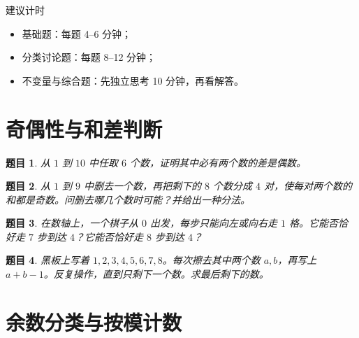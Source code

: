 \documentclass[11pt,a4paper,fontset=fandol]{ctexart}
\theoremstyle{formalexample}
\newtheorem{exercise}{题目}[section]
\begin{document}
\begin{notebox}{建议计时}
\begin{itemize}
  \item 基础题：每题 4--6 分钟；
  \item 分类讨论题：每题 8--12 分钟；
  \item 不变量与综合题：先独立思考 10 分钟，再看解答。
\end{itemize}
\end{notebox}

\section{奇偶性与和差判断}

\begin{center}
\end{center}

\begin{exercise}
从 $1$ 到 $10$ 中任取 $6$ 个数，证明其中必有两个数的差是偶数。
\end{exercise}

\begin{exercise}
从 $1$ 到 $9$ 中删去一个数，再把剩下的 $8$ 个数分成 $4$ 对，使每对两个数的和都是奇数。问删去哪几个数时可能？并给出一种分法。
\end{exercise}

\begin{exercise}
在数轴上，一个棋子从 $0$ 出发，每步只能向左或向右走 $1$ 格。它能否恰好走 $7$ 步到达 $4$？它能否恰好走 $8$ 步到达 $4$？
\end{exercise}

\begin{exercise}
黑板上写着 $1,2,3,4,5,6,7,8$。每次擦去其中两个数 $a,b$，再写上 $a+b-1$。反复操作，直到只剩下一个数。求最后剩下的数。
\end{exercise}

\section{余数分类与按模计数}
\end{document}
